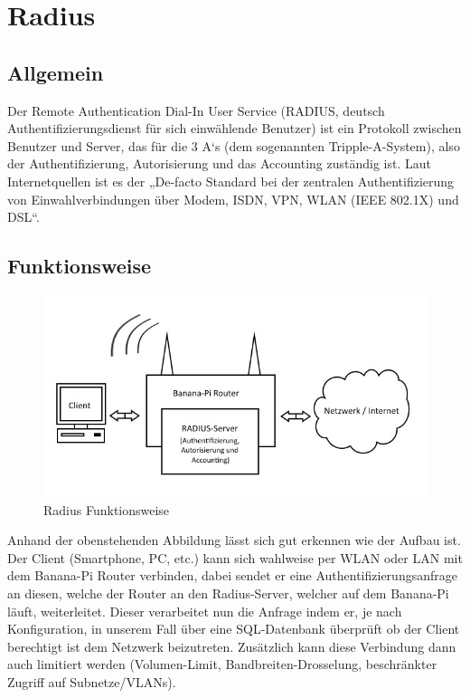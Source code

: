 \section{Radius}
\subsection{Allgemein}
Der Remote Authentication Dial-In User Service (RADIUS, deutsch Authentifizierungsdienst für sich
einwählende Benutzer) ist ein Protokoll zwischen Benutzer und Server, das für die 3 A‘s (dem
sogenannten Tripple-A-System), also der Authentifizierung, Autorisierung und das Accounting
zuständig ist.
Laut Internetquellen ist es der „De-facto Standard bei der zentralen Authentifizierung von
Einwahlverbindungen über Modem, ISDN, VPN, WLAN (IEEE 802.1X) und DSL“. \cite{rad1}

\subsection{Funktionsweise}
\begin{figure}[ht]                    
\includegraphics[width=\textwidth]{pictures/Tom/Radius}
\caption{Radius Funktionsweise}
\end{figure}
Anhand der obenstehenden Abbildung lässt sich gut erkennen wie der Aufbau ist. Der Client
(Smartphone, PC, etc.) kann sich wahlweise per WLAN oder LAN mit dem Banana-Pi Router
verbinden, dabei sendet er eine Authentifizierungsanfrage an diesen, welche der Router an den
Radius-Server, welcher auf dem Banana-Pi läuft, weiterleitet. Dieser verarbeitet nun die Anfrage
indem er, je nach Konfiguration, in unserem Fall über eine SQL-Datenbank überprüft ob der Client
berechtigt ist dem Netzwerk beizutreten. Zusätzlich kann diese Verbindung dann auch limitiert
werden (Volumen-Limit, Bandbreiten-Drosselung, beschränkter Zugriff auf Subnetze/VLANs).
\newpage

